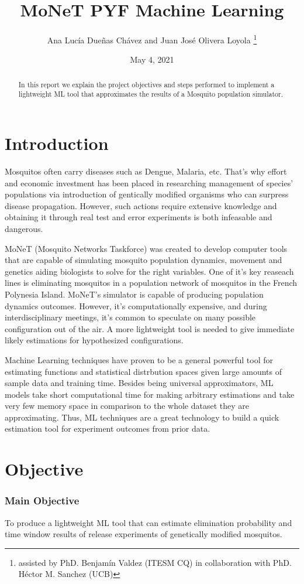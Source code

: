 \documentclass[12pt,letterpaper]{article}
\title{MoNeT PYF Machine Learning}
\author{Ana Lucía Dueñas Chávez and Juan José Olivera Loyola \thanks{assisted by PhD. Benjamín Valdez (ITESM CQ) in collaboration with PhD. Héctor M. Sanchez (UCB)}}
\date{May 4, 2021}
\begin{document}
\maketitle
\begin{abstract}
In this report we explain the project objectives and steps performed to implement a lightweight ML tool
that approximates the results of a Mosquito population simulator.
\end{abstract}

\section{Introduction}
Mosquitos often carry diseases such as Dengue, Malaria, etc. That's why effort and economic investment
has been placed in researching management of species' populations via introduction of gentically modified
organisms who can surpress disease propagation. However, such actions require extensive knowledge
and obtaining it through real test and error experiments is both infeasable and dangerous.

MoNeT (Mosquito Networks Taskforce) was created to develop computer tools that are capable of simulating 
mosquito population dynamics, movement and genetics aiding biologists to solve for the right variables.
One of it's key reaseach lines is eliminating mosquitos in a population network of mosquitos in the
French Polynesia Island. MoNeT's simulator is capable of producing population dynamics outcomes.
However, it's computationally expensive, and during interdisciplinary meetings,
it's common to speculate on many possible configuration out of the air. A more lightweight tool is needed
to give immediate likely estimations for hypothesized configurations.

Machine Learning techniques have proven to be a general powerful tool for estimating functions and
statistical distrbution spaces given large amounts of sample data and training time. 
Besides being universal approximators, ML models take short computational time for making arbitrary estimations
and take very few memory space in comparison to the whole dataset they are approximating. 
Thus, ML techniques are a great technology to build
a quick estimation tool for experiment outcomes from prior data.
\section{Objective}
\subsubsection{Main Objective}
To produce a lightweight ML tool that can estimate elimination probability and time window results
of release experiments of genetically modified mosquitos.
\end{document}
